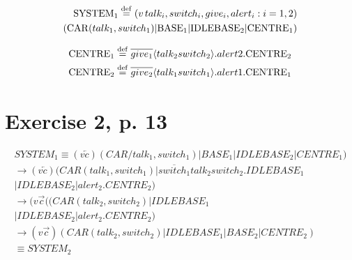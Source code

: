 \begin{equation}
\begin{split}
{\rm SYSTEM_1} \stackrel{\mathrm{def}}{=} (v\,talk_i , switch_i , give_i , alert_i : i = 1,2) \\
({\rm CAR}(talk_1 , switch_1) | {\rm BASE_1} | {\rm IDLEBASE_2} | {\rm CENTRE_1})
\end{split}
\end{equation}

\begin{equation}
\begin{split}
{\rm CENTRE_1} \stackrel{\mathrm{def}}{=} \overline{give_1} \langle talk_2 switch_2 \rangle .alert2.{\rm CENTRE_2} \\ 
{\rm CENTRE_2} \stackrel{\mathrm{def}}{=} \overline{give_2} \langle talk_1 switch_1 \rangle .alert1.{\rm CENTRE_1}
\end{split}
\end{equation}

\section{Exercise 2, p. 13}

\begin{equation}
\begin{split}
SYSTEM_1 \equiv  (v\overleftarrow{c})(CAR/talk_1,switch_1) | BASE_1 | IDLEBASE_2 | CENTRE_1) \\
\rightarrow (v\overleftarrow{c})(CAR(talk_1, switch_1) | \overline{switch_1}talk_2switch_2.IDLEBASE_1 \\
| IDLEBASE_2 | alert_2.CENTRE_2) \\
\rightarrow (v\overrightarrow{c}((CAR(talk_2,switch_2) | IDLEBASE_1 \\
| IDLEBASE_2 | alert_2.CENTRE_2) \\
\rightarrow (v\overrightarrow{c})(CAR(talk_2,switch_2) | IDLEBASE_1 | BASE_2 | CENTRE_2) \\
\equiv SYSTEM_2
\end{split}
\end{equation}

